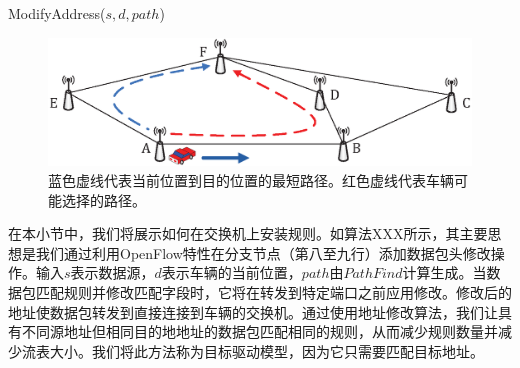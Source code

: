 \documentclass{ctexart}
\begin{document}
\begin{algorithm}[t]
\caption{ModifyAddress($s,d,path$)}
\label{Algorithm 3}
\begin{algorithmic}[1]

\end{algorithmic}
\vspace{-0.06in}
\end{algorithm}

\vspace{-0.05in}

\begin{figure} [t]
\begin{center}
\includegraphics[width=0.9\columnwidth]{figures/fig-5-31.eps}
\caption{蓝色虚线代表当前位置到目的位置的最短路径。红色虚线代表车辆可能选择的路径。} \label{fig5}
\end{center}
\vspace{-0.3in}
\end{figure}

在本小节中，我们将展示如何在交换机上安装规则。如算法XXX所示，其主要思想是我们通过利用OpenFlow特性在分支节点（第八至九行）添加数据包头修改操作。输入$s$表示数据源，$d$表示车辆的当前位置，$path$由$PathFind$计算生成。当数据包匹配规则并修改匹配字段时，它将在转发到特定端口之前应用修改。修改后的地址使数据包转发到直接连接到车辆的交换机。通过使用地址修改算法，我们让具有不同源地址但相同目的地地址的数据包匹配相同的规则，从而减少规则数量并减少流表大小。我们将此方法称为目标驱动模型，因为它只需要匹配目标地址。
\end{document}
